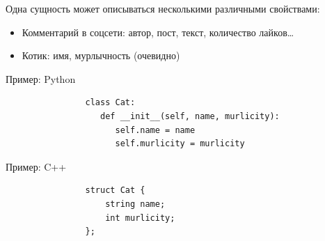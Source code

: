     \begin{frame}[fragile]{\subsecname}
        Одна сущность может описываться несколькими различными свойствами:
        \begin{itemize}
            \item Комментарий в соцсети: автор, пост, текст, количество лайков\ldots
            \item Котик: имя, мурлычность (очевидно)
        \end{itemize}
        \begin{block}{Пример: Python}
            \begin{verbatim}
                class Cat:
                   def __init__(self, name, murlicity):
                      self.name = name
                      self.murlicity = murlicity
            \end{verbatim}
        \end{block}
        \begin{block}{Пример: C++}
            \begin{verbatim}
                struct Cat {
                    string name;
                    int murlicity;
                };
            \end{verbatim}
        \end{block}
    \end{frame}

